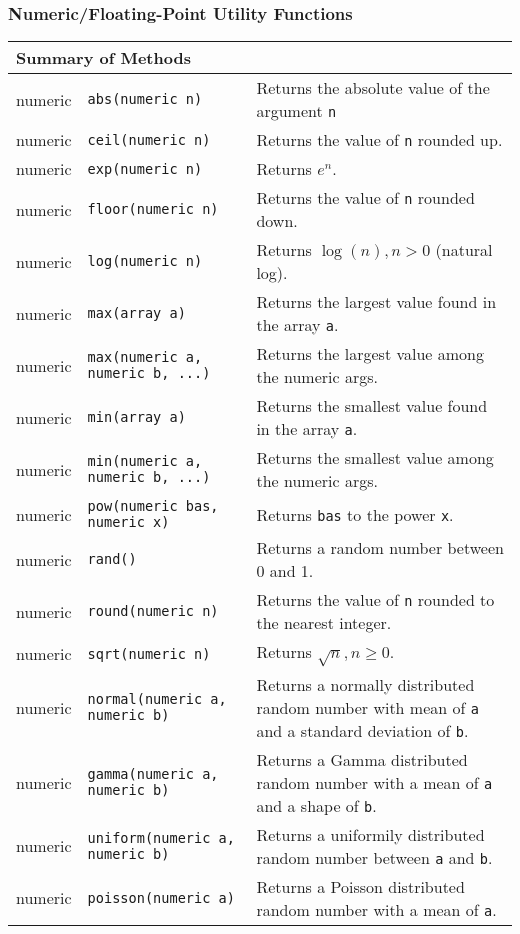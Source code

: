\subsubsection{Numeric/Floating-Point Utility Functions}

\begin{tabular}{|p{0.8in}|p{2.2in}||p{3in}|}
  \hline
  \multicolumn{3}{|l|}{\textbf{Summary of Methods}}\\
  \hline
  numeric & {\tt abs(numeric n)} & Returns the absolute value of the argument {\tt n} \\
  numeric & {\tt ceil(numeric n)} & Returns the value of {\tt n} rounded up.\\
  numeric & {\tt exp(numeric n)} & Returns $e^{n}$.\\
  numeric & {\tt floor(numeric n)} & Returns the value of {\tt n} rounded down.\\
  numeric & {\tt log(numeric n)} & Returns $\log(n), n > 0$ (natural log).\\
  numeric & {\tt max(array a)} & Returns the largest value found in the array \texttt{a}.\\
  numeric & {\tt max(numeric a, numeric b, ...)} & Returns the largest value among the numeric args.\\
  numeric & {\tt min(array a)} & Returns the smallest value found in the array \texttt{a}.\\
  numeric & {\tt min(numeric a, numeric b, ...)} & Returns the smallest value among the numeric args.\\
  numeric & {\tt pow(numeric bas, numeric x)} & Returns {\tt bas} to the power {\tt x}.\\
  numeric & {\tt rand()} & Returns a random number between 0 and 1.\\
  numeric & {\tt round(numeric n)} & Returns the value of {\tt n} rounded to the nearest integer.\\
  numeric & {\tt sqrt(numeric n)} & Returns $\sqrt{n}, n \ge 0$.\\
  \hline
  numeric & {\tt normal(numeric a, numeric b)} & Returns a normally distributed random number with mean of {\tt a} and a standard deviation of {\tt b}.\\
  numeric & {\tt gamma(numeric a, numeric b)} & Returns a Gamma distributed random number with a mean of {\tt a} and a shape of {\tt b}.\\
  numeric & {\tt uniform(numeric a, numeric b)} & Returns a uniformily distributed random number between {\tt a} and {\tt b}.\\
  numeric & {\tt poisson(numeric a)} & Returns a Poisson distributed random number with a mean of {\tt a}.\\
  \hline
\end{tabular}

